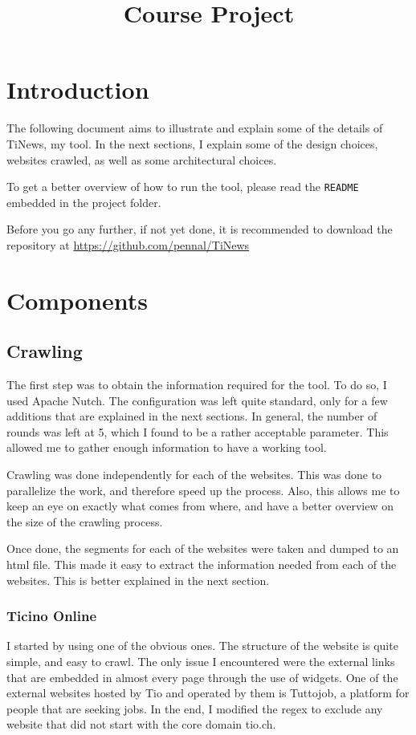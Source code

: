 \documentclass[a4paper]{article}
\title{\huge Course Project}
\date{}
\begin{document}
\maketitle
\vspace{-10mm}

\section{Introduction}
The following document aims to illustrate and explain some of the details of TiNews, my tool. In the next sections, I explain some of the design choices, websites crawled, as well as some architectural choices. 

To get a better overview of how to run the tool, please read the \texttt{README} embedded in the project folder. 

Before you go any further, if not yet done, it is recommended to download the repository at \url{https://github.com/pennal/TiNews}
\section{Components}
\subsection{Crawling}
The first step was to obtain the information required for the tool. To do so, I used Apache Nutch. The configuration was left quite standard, only for a few additions that are explained in the next sections. In general, the number of rounds was left at 5, which I found to be a rather acceptable parameter. This allowed me to gather enough information to have a working tool. 

Crawling was done independently for each of the websites. This was done to parallelize the work, and therefore speed up the process. Also, this allows me to keep an eye on exactly what comes from where, and have a better overview on the size of the crawling process.

Once done, the segments for each of the websites were taken and dumped to an html file. This made it easy to extract the information needed from each of the websites. This is better explained in the next section. 
\subsubsection{Ticino Online}
I started by using one of the obvious ones. The structure of the website is quite simple, and easy to crawl. The only issue I encountered were the external links that are embedded in almost every page through the use of widgets. One of the external websites hosted by Tio and operated by them is Tuttojob, a platform for people that are seeking jobs. In the end, I modified the regex to exclude any website that did not start with the core domain tio.ch.
\end{document}
